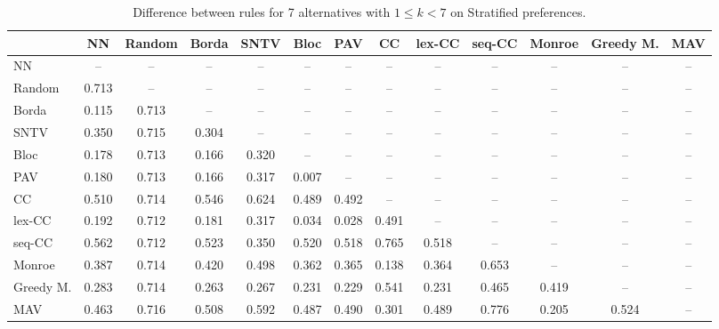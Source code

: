 
\begin{table*}[h!]
\centering
\begin{tabular}{lcccccccccccc}
\toprule
 & NN & Random & Borda & SNTV & Bloc & PAV & CC & lex-CC & seq-CC & Monroe & Greedy M. & MAV \\
\midrule
NN & -- & -- & -- & -- & -- & -- & -- & -- & -- & -- & -- & -- \\
Random & 0.713 & -- & -- & -- & -- & -- & -- & -- & -- & -- & -- & -- \\
Borda & 0.115 & 0.713 & -- & -- & -- & -- & -- & -- & -- & -- & -- & -- \\
SNTV & 0.350 & 0.715 & 0.304 & -- & -- & -- & -- & -- & -- & -- & -- & -- \\
Bloc & 0.178 & 0.713 & 0.166 & 0.320 & -- & -- & -- & -- & -- & -- & -- & -- \\
PAV & 0.180 & 0.713 & 0.166 & 0.317 & 0.007 & -- & -- & -- & -- & -- & -- & -- \\
CC & 0.510 & 0.714 & 0.546 & 0.624 & 0.489 & 0.492 & -- & -- & -- & -- & -- & -- \\
lex-CC & 0.192 & 0.712 & 0.181 & 0.317 & 0.034 & 0.028 & 0.491 & -- & -- & -- & -- & -- \\
seq-CC & 0.562 & 0.712 & 0.523 & 0.350 & 0.520 & 0.518 & 0.765 & 0.518 & -- & -- & -- & -- \\
Monroe & 0.387 & 0.714 & 0.420 & 0.498 & 0.362 & 0.365 & 0.138 & 0.364 & 0.653 & -- & -- & -- \\
Greedy M. & 0.283 & 0.714 & 0.263 & 0.267 & 0.231 & 0.229 & 0.541 & 0.231 & 0.465 & 0.419 & -- & -- \\
MAV & 0.463 & 0.716 & 0.508 & 0.592 & 0.487 & 0.490 & 0.301 & 0.489 & 0.776 & 0.205 & 0.524 & -- \\
\bottomrule
\end{tabular}

\caption{Difference between rules for 7 alternatives with $1 \leq k < 7$ on Stratified preferences.}
\end{table*}
